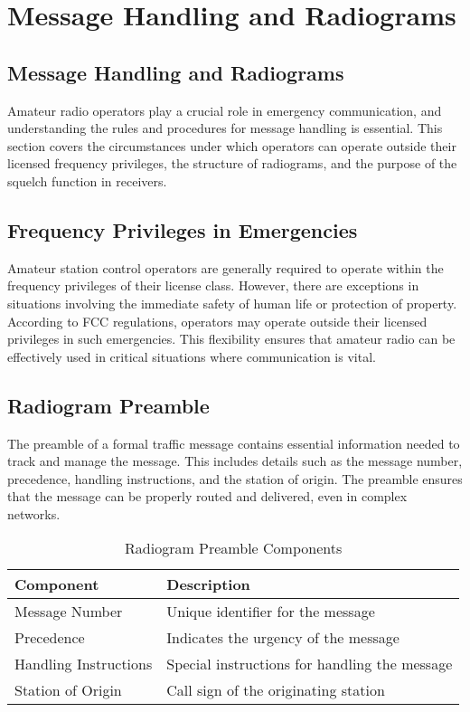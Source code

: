 \section{Message Handling and Radiograms}
\label{section:message_handling}

\subsection*{Message Handling and Radiograms}

Amateur radio operators play a crucial role in emergency communication, and understanding the rules and procedures for message handling is essential. This section covers the circumstances under which operators can operate outside their licensed frequency privileges, the structure of radiograms, and the purpose of the squelch function in receivers.

\subsection*{Frequency Privileges in Emergencies}

Amateur station control operators are generally required to operate within the frequency privileges of their license class. However, there are exceptions in situations involving the immediate safety of human life or protection of property. According to FCC regulations, operators may operate outside their licensed privileges in such emergencies. This flexibility ensures that amateur radio can be effectively used in critical situations where communication is vital.

\subsection*{Radiogram Preamble}

The preamble of a formal traffic message contains essential information needed to track and manage the message. This includes details such as the message number, precedence, handling instructions, and the station of origin. The preamble ensures that the message can be properly routed and delivered, even in complex networks.

\begin{table}[h]
    \centering
    \caption{Radiogram Preamble Components}
    \label{tab:radiogram_preamble}
    \begin{tabular}{|l|l|}
        \hline
        \textbf{Component} & \textbf{Description} \\
        \hline
        Message Number & Unique identifier for the message \\
        Precedence & Indicates the urgency of the message \\
        Handling Instructions & Special instructions for handling the message \\
        Station of Origin & Call sign of the originating station \\
        \hline
    \end{tabular}
\end{table}

